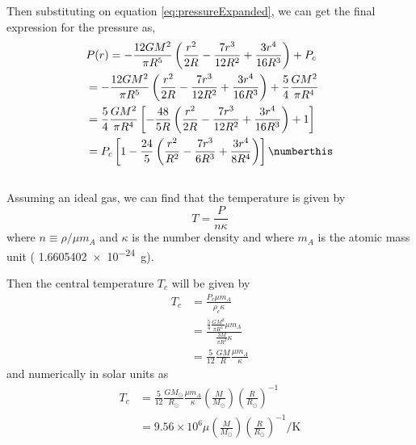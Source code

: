 Then substituting on equation \ref{eq:pressureExpanded}, we can get the final expression for the pressure as,
\begin{align*}
    & P(r) = -\frac{12GM^2}{\pi R^5}\left(\frac{r^2}{2R}-\frac{7r^3}{12R^2}+\frac{3r^4}{16R^3}\right) + P_c\\
    &= -\frac{12GM^2}{\pi R^5}\left(\frac{r^2}{2R}-\frac{7r^3}{12R^2}+\frac{3r^4}{16R^3}\right) + \frac{5}{4}\frac{GM^2}{\pi R^4}\\
    &= \frac{5}{4}\frac{GM^2}{\pi R^4}\left[-\frac{48}{5 R}\left(\frac{r^2}{2R}-\frac{7r^3}{12R^2}+\frac{3r^4}{16R^3}\right) +1 \right]\\
    &= P_c\left[1-\frac{24}{5}\left(\frac{r^2}{R^2}-\frac{7r^3}{6R^3}+\frac{3r^4}{8R^4}\right)\right]\numberthis\label{eq:pressureLinearModel}
\end{align*}

 

\subsection{}
Assuming an ideal gas, we can find that the temperature is given by 
\begin{equation}
    T=\frac{P}{n\kappa}
\end{equation}
where $n\equiv \rho/\mu m_A$ and $\kappa$ is the number density and where $m_A$ is the atomic mass unit ( \SI{1.6605402e-24}{\g}).

Then the central temperature $T_c$ will be given by
\begin{align*}
    T_c &=\frac{P_c\mu m_A}{\rho_c\kappa}\\
    &=\frac{\frac{5}{4}\frac{GM^2}{\pi R^4} \mu m_A}{\frac{3M}{\pi R^3}\kappa}\\
    &= \frac{5}{12}\frac{GM}{R}\frac{\mu m_A}{\kappa}
\end{align*}
and numerically in solar units as
\begin{align*}
    T_c &= \frac{5}{12}\frac{GM_\odot}{R_\odot}\frac{\mu m_A}{\kappa}\left(\frac{M}{M_\odot}\right)\left(\frac{R}{R_\odot}\right)^{-1}\\
    &= 9.56\times 10^6 \mu \left(\frac{M}{M_\odot}\right)\left(\frac{R}{R_\odot}\right)^{-1}\si{\per\kelvin}
\end{align*}

